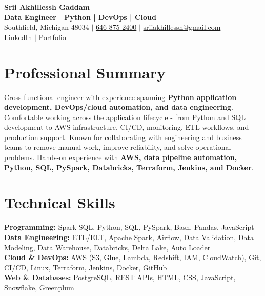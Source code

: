 \documentclass[letterpaper,10pt]{article}
\begin{document}
\fontsize{9.35pt}{10.45pt}\selectfont

\begin{center}
    {\LARGE \textbf{Srii Akhillessh Gaddam}} \\[-1pt]
    \textbf{Data Engineer | Python | DevOps | Cloud} \\[2pt]
    Southfield, Michigan 48034 $|$
    \href{tel:6468752400}{646-875-2400} $|$
    \href{mailto:sriiakhillessh@gmail.com}{sriiakhillessh@gmail.com} \\[1pt]
    \href{https://www.linkedin.com/in/srii-akhiilessh-gaddam-b48668191/}{LinkedIn} $|$
    \href{https://sriiakhillesshg.github.io/portfolio/}{Portfolio}
\end{center}
\vspace{-8pt}

\section{Professional Summary}
\small{Cross-functional engineer with experience spanning \textbf{Python application development, DevOps/cloud automation, and data engineering}. Comfortable working across the application lifecycle - from Python and SQL development to AWS infrastructure, CI/CD, monitoring, ETL workflows, and production support. Known for collaborating with engineering and business teams to remove manual work, improve reliability, and solve operational problems. Hands-on experience with \textbf{AWS, data pipeline automation, Python, SQL, PySpark, Databricks, Terraform, Jenkins, and Docker}.}

\section{Technical Skills}
\small{
\textbf{Programming:} Spark SQL, Python, SQL, PySpark, Bash, Pandas, JavaScript \\
\textbf{Data Engineering:} ETL/ELT, Apache Spark, Airflow, Data Validation, Data Modeling, Data Warehouse, Databricks, Delta Lake, Auto Loader \\
\textbf{Cloud \& DevOps:} AWS (S3, Glue, Lambda, Redshift, IAM, CloudWatch), Git, CI/CD, Linux, Terraform, Jenkins, Docker, GitHub \\
\textbf{Web \& Databases:} PostgreSQL, REST APIs, HTML, CSS, JavaScript, Snowflake, Greenplum
}
\end{document}

